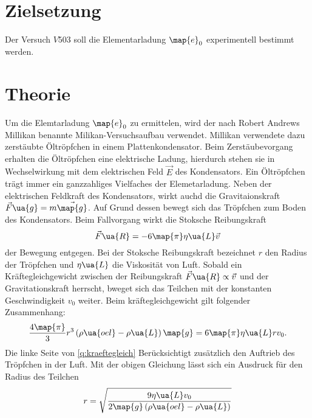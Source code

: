 \setcounter{page}{1}
\section*{Zielsetzung}
Der Versuch $V503$ soll die Elementarladung $\map{e}_0$ experimentell bestimmt werden.
\section{Theorie}

Um die Elemtarladung $\map{e}_0$ zu ermittelen, wird der nach Robert Andrews Millikan benannte
Milikan-Versuchsaufbau verwendet. Millikan verwendete dazu zerstäubte Öltröpfchen in einem
Plattenkondensator. Beim Zerstäubevorgang erhalten die Öltröpfchen eine elektrische
Ladung, hierdurch stehen sie in Wechselwirkung mit dem elektrischen Feld $\vec{E}$ des
Kondensators. Ein Öltröpfchen trägt immer ein ganzzahliges Vielfaches der Elemetarladung.
Neben der elektrischen Feldkraft des Kondensators, wirkt auchd die Gravitaionskraft
$\vec{F}\ua{g}=m\vec{\map{g}}$. Auf Grund dessen bewegt sich das Tröpfchen zum Boden
des Kondensators. Beim Fallvorgang wirkt die Stoksche Reibungskraft
\begin{equation*}
  \vec{F}\ua{R}=-6\map{\pi}\eta\ua{L}\vec{v}
\end{equation*}
der Bewegung entgegen. Bei der Stoksche Reibungskraft bezeichnet $r$ den Radius der
Tröpfchen und $\eta\ua{L}$ die Viskosität von Luft. Sobald ein Kräftegleichgewicht
zwischen der Reibungskraft $\vec{F}\ua{R}\propto \vec{v}$ und der Gravitationskraft
herrscht, bweget sich das Teilchen mit der konstanten Geschwindigkeit $v_0$ weiter.
Beim kräftegleichgewicht gilt folgender Zusammenhang:
\begin{equation}
  \label{eq:kraeftegleich}
  \frac{4\map{\pi}}{3}r^3\left(\rho\ua{oel}-\rho\ua{L}\right)\map{g}=6\map{\pi}\eta\ua{L}r v_0.
\end{equation}
Die linke Seite von \eqref{q:kraeftegleich} Berücksichtigt zusätzlich den Auftrieb des
Tröpfchen in der Luft. Mit der obigen Gleichung lässt sich ein Ausdruck für den Radius
des Teilchen
\begin{equation}
  \label{eq:radius_teilchen}
  r=\sqrt{\frac{9\eta\ua{L}v_0}{2\map{g}\left(\rho\ua{oel}-\rho\ua{L}\right)}}
\end{equation}


